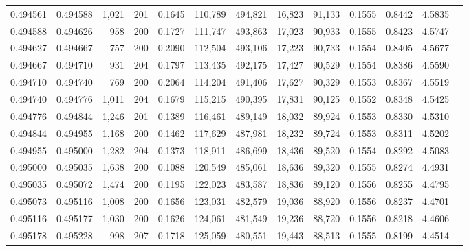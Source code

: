 \begin{tabular}{rrrrrrrrrrrrr}
0.494561 & 0.494588 & 1,021 & 201 &                                     0.1645 & 110,789 & 494,821 &  16,823 &  91,133 & 0.1555 & 0.8442 & 4.5835 \\
0.494588 & 0.494626 &   958 & 200 &                                     0.1727 & 111,747 & 493,863 &  17,023 &  90,933 & 0.1555 & 0.8423 & 4.5747 \\
0.494627 & 0.494667 &   757 & 200 &                                     0.2090 & 112,504 & 493,106 &  17,223 &  90,733 & 0.1554 & 0.8405 & 4.5677 \\
0.494667 & 0.494710 &   931 & 204 &                                     0.1797 & 113,435 & 492,175 &  17,427 &  90,529 & 0.1554 & 0.8386 & 4.5590 \\
0.494710 & 0.494740 &   769 & 200 &                                     0.2064 & 114,204 & 491,406 &  17,627 &  90,329 & 0.1553 & 0.8367 & 4.5519 \\
0.494740 & 0.494776 & 1,011 & 204 &                                     0.1679 & 115,215 & 490,395 &  17,831 &  90,125 & 0.1552 & 0.8348 & 4.5425 \\
0.494776 & 0.494844 & 1,246 & 201 &                                     0.1389 & 116,461 & 489,149 &  18,032 &  89,924 & 0.1553 & 0.8330 & 4.5310 \\
0.494844 & 0.494955 & 1,168 & 200 &                                     0.1462 & 117,629 & 487,981 &  18,232 &  89,724 & 0.1553 & 0.8311 & 4.5202 \\
0.494955 & 0.495000 & 1,282 & 204 &                                     0.1373 & 118,911 & 486,699 &  18,436 &  89,520 & 0.1554 & 0.8292 & 4.5083 \\
0.495000 & 0.495035 & 1,638 & 200 &                                     0.1088 & 120,549 & 485,061 &  18,636 &  89,320 & 0.1555 & 0.8274 & 4.4931 \\
0.495035 & 0.495072 & 1,474 & 200 &                                     0.1195 & 122,023 & 483,587 &  18,836 &  89,120 & 0.1556 & 0.8255 & 4.4795 \\
0.495073 & 0.495116 & 1,008 & 200 &                                     0.1656 & 123,031 & 482,579 &  19,036 &  88,920 & 0.1556 & 0.8237 & 4.4701 \\
0.495116 & 0.495177 & 1,030 & 200 &                                     0.1626 & 124,061 & 481,549 &  19,236 &  88,720 & 0.1556 & 0.8218 & 4.4606 \\
0.495178 & 0.495228 &   998 & 207 &                                     0.1718 & 125,059 & 480,551 &  19,443 &  88,513 & 0.1555 & 0.8199 & 4.4514 \\

\end{tabular}
